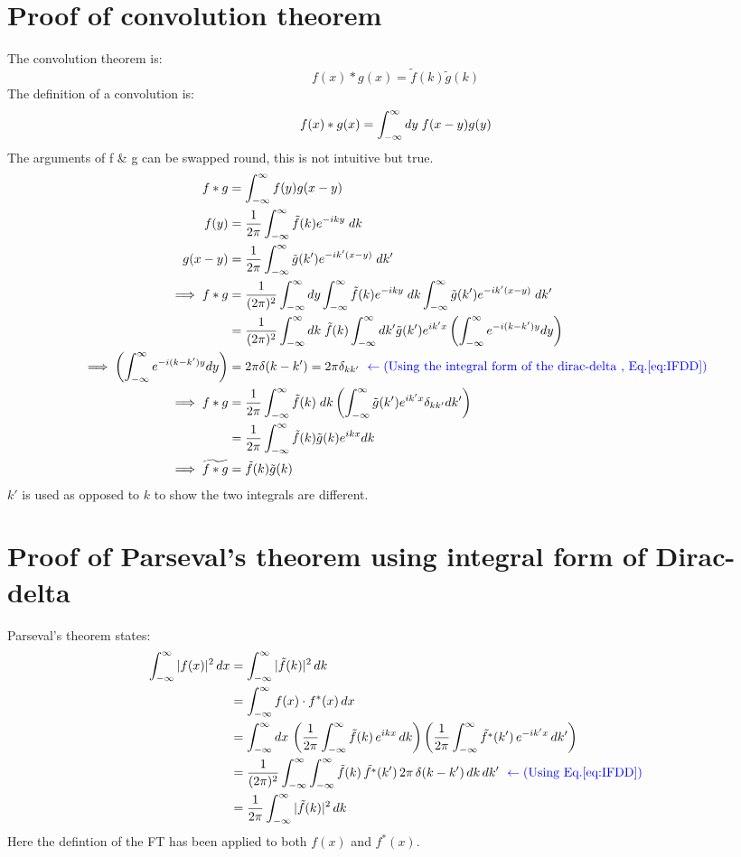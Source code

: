 \documentclass{article}
\begin{document}
\section{Proof of convolution theorem}
The convolution theorem is:
\begin{equation}
    f(x)*g(x)=\tilde{f}(k)\tilde{g}(k)
\end{equation}
The definition of a convolution is: 
\begin{equation}
    f(x)*g(x) = \int_{-\infty}^{\infty} dy\;f(x-y)g(y)
\end{equation}
The arguments of f \& g can be swapped round, this is not intuitive but true.
\begin{align*}
    f*g &= \int_{-\infty}^{\infty} f(y)g(x-y) \\
    f(y)&= \frac{1}{2\pi}\int_{-\infty}^{\infty}\tilde{f}(k)e^{-iky}\;dk \\
    g(x-y)&=\frac{1}{2\pi}\int_{-\infty}^{\infty}\tilde{g}(k')e^{-ik{'}(x-y)}\;dk{'} \label{primed} \\
    \implies f*g &= \frac{1}{(2\pi)^2} \int_{-\infty}^{\infty} dy \int_{-\infty}^{\infty}\tilde{f}(k)e^{-iky}\;dk\int_{-\infty}^{\infty}\tilde{g}(k')e^{-ik{'}(x-y)}\;dk{'}\\
    &=\frac{1}{(2\pi)^2}\int_{-\infty}^{\infty} dk\; \tilde{f}(k)\int_{-\infty}^{\infty} dk{'} \tilde{g}(k') e^{ik{'}x} 
    \left ( \int_{-\infty}^{\infty} e^{-i(k-k')y} dy \right )\ \\
    \implies \left ( \int_{-\infty}^{\infty} e^{-i(k-k')y} dy \right ) &= 2\pi \delta(k-k') = 2\pi \delta_{kk'}\ \color{blue}\leftarrow\text{(Using the integral form of the dirac-delta , Eq.\ref{eq:IFDD})}\\
    \implies f*g &= \frac{1}{2\pi} \int_{-\infty}^{\infty} \tilde{f}(k)\;dk\left ( \int_{-\infty}^{\infty} \tilde{g}(k') e^{ik'x} \delta_{kk'} dk' \right)\\
    &= \frac{1}{2\pi} \int_{-\infty}^{\infty} \tilde{f}(k)\tilde{g}(k)e^{ikx}dk \\
    \implies \widetilde{f*g} &= \tilde{f}(k)\tilde{g}(k)  
\end{align*}
$k{'}$ is used as opposed to $k$ to show the two integrals are different.

\newpage
\section{Proof of Parseval's theorem using integral form of Dirac-delta}

    Parseval's theorem states:
    \begin{align*}
    \int_{-\infty}^{\infty} |f(x)|^2 \, dx &= \int_{-\infty}^{\infty} |\tilde{f}(k)|^2 \, dk \\
    &= \int_{-\infty}^{\infty} f(x) \cdot f^*(x) \, dx \\
    &= \int_{-\infty}^{\infty} dx \,\left(\frac{1}{2\pi} \int_{-\infty}^{\infty} \tilde{f}(k) \, e^{ikx} \, dk\right) \left(\frac{1}{2\pi} \int_{-\infty}^{\infty} \tilde{f^*}(k')\, e^{-ik'x} \, dk'\right)  \\
    &= \frac{1}{(2\pi)^2} \int_{-\infty}^{\infty} \int_{-\infty}^{\infty} \tilde{f}(k) \, \tilde{f^*}(k') \, 2\pi \, \delta(k - k') \, dk \, dk'\ \color{blue}\leftarrow\text{(Using Eq.\ref{eq:IFDD})} \\
    &= \frac{1}{2\pi} \int_{-\infty}^{\infty} |\tilde{f}(k)|^2 \, dk
    \end{align*}
Here the defintion of the FT has been applied to both $f(x)$ and $f^*(x)$.
\end{document}
